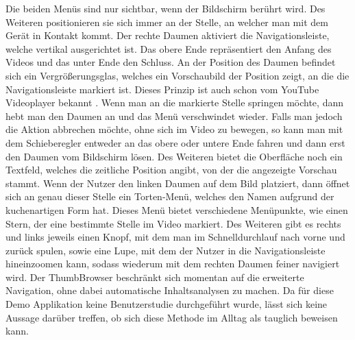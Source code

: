 \documentclass[11pt,a4paper]{report}
\begin{document}
Die beiden Menüs sind nur sichtbar, wenn der Bildschirm berührt wird. Des Weiteren positionieren sie sich immer an der Stelle, an welcher man mit dem Gerät in Kontakt kommt. Der rechte Daumen aktiviert die Navigationsleiste, welche vertikal ausgerichtet ist. Das obere Ende repräsentiert den Anfang des Videos und das unter Ende den Schluss. An der Position des Daumen befindet sich ein Vergrößerungsglas, welches ein Vorschaubild der Position zeigt, an die die Navigationsleiste markiert ist. Dieses Prinzip ist auch schon vom YouTube Videoplayer bekannt \cite{YouTubeHomepage}. Wenn man an die markierte Stelle springen möchte, dann hebt man den Daumen an und das Menü verschwindet wieder. Falls man jedoch die Aktion abbrechen möchte, ohne sich im Video zu bewegen, so kann man mit dem Schieberegler entweder an das obere oder untere Ende fahren und dann erst den Daumen vom Bildschirm lösen. Des Weiteren bietet die Oberfläche noch ein Textfeld, welches die zeitliche Position angibt, von der die angezeigte Vorschau stammt. Wenn der Nutzer den linken Daumen auf dem Bild platziert, dann öffnet sich an genau dieser Stelle ein Torten-Menü, welches den Namen aufgrund der kuchenartigen Form hat. Dieses Menü bietet verschiedene Menüpunkte, wie einen Stern, der eine bestimmte Stelle im Video markiert. Des Weiteren gibt es rechts und links jeweils einen Knopf, mit dem man im Schnelldurchlauf nach vorne und zurück spulen, sowie eine Lupe, mit dem der Nutzer in die Navigationsleiste hineinzoomen kann, sodass wiederum mit dem rechten Daumen feiner navigiert wird. Der ThumbBrowser beschränkt sich momentan auf die erweiterte Navigation, ohne dabei automatische Inhaltsanalysen zu machen. Da für diese Demo Applikation keine Benutzerstudie durchgeführt wurde, lässt sich keine Aussage darüber treffen, ob sich diese Methode im Alltag als tauglich beweisen kann. \cite{hudelist2013mobile}
\end{document}
